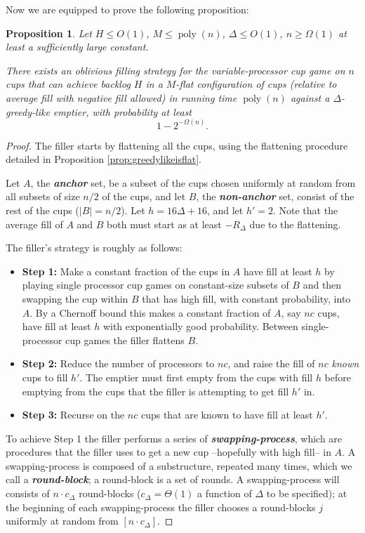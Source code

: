 \documentclass[twocolumn]{article}[10pt]
\newcommand{\defn}[1]{{\textit{\textbf{\boldmath #1}}}\xspace}
\DeclareMathOperator{\poly}{\text{poly}}
\newtheorem{proposition}{Proposition}
\begin{document}
Now we are equipped to prove the following proposition:
\begin{proposition}
  \label{prop:obliviousBase}
  Let $H \le O(1)$, $M \le \poly(n)$, $\Delta \le O(1)$, $n \ge \Omega(1)$ at
  least a sufficiently large constant. 

  There exists an oblivious filling strategy for the variable-processor cup
  game on $n$ cups that can achieve backlog $H$ in a $M$-flat configuration of
  cups (relative to average fill with negative fill allowed) in running time
  $\poly(n)$ against a $\Delta$-greedy-like emptier, with probability at least
  $$1-2^{-\Omega(n)}.$$
\end{proposition}
\begin{proof}
  The filler starts by flattening all the cups, using the
  flattening procedure detailed in Proposition
  \ref{prop:greedylikeisflat}. 

  Let $A$, the \defn{anchor} set, be a subset of the cups chosen uniformly at
  random from all subsets of size $n/2$ of the cups, and let $B$, the
  \defn{non-anchor} set, consist of the rest of the cups ($|B| = n/2$). Let $h
  = 16\Delta + 16$, and let $h' = 2$. Note that the average fill of $A$ and $B$
  both must start as at least $-R_\Delta$ due to the flattening.

  The filler's strategy is roughly as follows: 
  \begin{itemize}
    \item \textbf{Step 1:} Make a constant fraction of the cups in $A$ have
      fill at least $h$ by playing single processor cup games on constant-size
      subsets of $B$ and then swapping the cup within $B$ that has high fill,
      with constant probability, into $A$. By a Chernoff bound this makes a
      constant fraction of $A$, say $nc$ cups, have fill at least $h$ with
      exponentially good probability. Between single-processor cup games the
      filler flattens $B$.
    \item \textbf{Step 2:} Reduce the number of processors to $nc$, and raise
      the fill of $nc$ \emph{known} cups to fill $h'$. The emptier must first
      empty from the cups with fill $h$ before emptying from the cups that
      the filler is attempting to get fill $h'$ in.
    \item \textbf{Step 3:} Recurse on the $nc$ cups that are known to have fill
      at least $h'$.
  \end{itemize}

To achieve Step 1 the filler performs a series of \defn{swapping-process},
which are procedures that the filler uses to get a new cup --hopefully with
high fill-- in $A$. A swapping-process is composed of a substructure, repeated
many times, which we call a \defn{round-block}; a round-block is a set of
rounds. A swapping-process will consists of $n\cdot c_\Delta$ round-blocks
($c_\Delta = \Theta(1)$ a function of $\Delta$ to be specified); at the beginning
of each swapping-process the filler chooses a round-blocks $j$ uniformly at
random from $[n\cdot c_\Delta]$. 


\end{proof}
\end{document}
